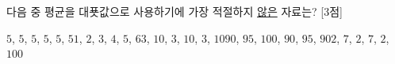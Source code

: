 다음 중 평균을 대푯값으로 사용하기에 가장 적절하지 \underline{않은} 자료는? \mbox{[3점]}
\begin{choicesii}{$5$, $5$, $5$, $5$, $5$, $5$}{$1$, $2$, $3$, $4$, $5$, $6$}{$3$, $10$, $3$, $10$, $3$, $10$}{$90$, $95$, $100$, $90$, $95$, $90$}{$2$, $7$, $2$, $7$, $2$, $100$}\end{choicesii}
